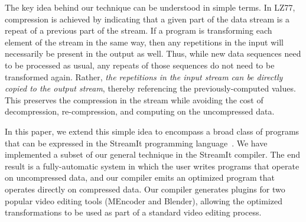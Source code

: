 
The key idea behind our technique can be understood in simple terms.
In LZ77, compression is achieved by indicating that a given part of
the data stream is a repeat of a previous part of the stream.  If a
program is transforming each element of the stream in the same way,
then any repetitions in the input will necessarily be present in the
output as well.  Thus, while new data sequences need to be processed
as usual, any repeats of those sequences do not need to be transformed
again.  Rather, {\it the repetitions in the input stream can be
  directly copied to the output stream}, thereby referencing the
previously-computed values.  This preserves the compression in the
stream while avoiding the cost of decompression, re-compression, and
computing on the uncompressed data.  


In this paper, we extend this simple idea to encompass a broad class
of programs that can be expressed in the StreamIt programming
language~\cite{streamitcc}.  We have implemented a subset of our
general technique in the StreamIt compiler.  The end result is a
fully-automatic system in which the user writes programs that operate
on uncompressed data, and our compiler emits an optimized program that
operates directly on compressed data.  Our compiler generates plugins
for two popular video editing tools (MEncoder and Blender), allowing
the optimized transformations to be used as part of a standard video
editing process.

